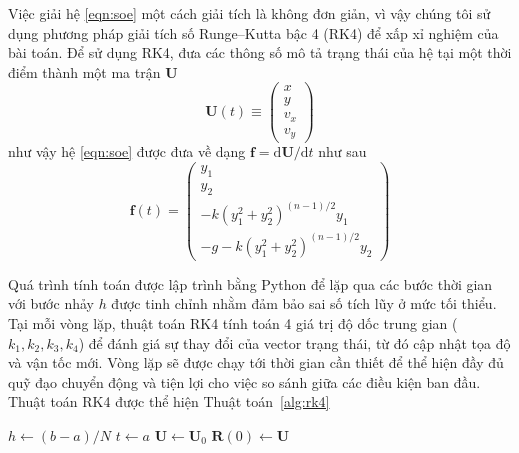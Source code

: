 Việc giải hệ \eqref{eqn:soe} một cách giải tích là không đơn giản, vì vậy chúng tôi sử dụng phương pháp giải tích số Runge--Kutta bậc 4 (RK4) để xấp xỉ nghiệm của bài toán. Để sử dụng RK4, đưa các thông số mô tả trạng thái của hệ tại một thời điểm thành một ma trận \(\mathbf{U}\)
\begin{equation}
  \mathbf{U}(t) \equiv \begin{pmatrix}
    x \\
    y \\
    v_x \\
    v_y
  \end{pmatrix}
\end{equation}
như vậy hệ \eqref{eqn:soe} được đưa về dạng \(\mathbf{f} = \mathrm{d}\mathbf{U}/\mathrm{d}t\) như sau
\begin{equation}
  \mathbf{f}(t) = \begin{pmatrix}
    y_1 \\
    y_2 \\
    -k(y_1^2 + y_2^2)^{(n - 1)/2} y_1 \\
    -g - k(y_1^2 + y_2^2)^{(n - 1)/2} y_2
  \end{pmatrix}
\end{equation}

Quá trình tính toán được lập trình bằng Python để lặp qua các bước thời gian với bước nhảy $h$ được tinh chỉnh nhằm đảm bảo sai số tích lũy ở mức tối thiểu. Tại mỗi vòng lặp, thuật toán RK4 tính toán 4 giá trị độ dốc trung gian ($k_1, k_2, k_3, k_4$) để đánh giá sự thay đổi của vector trạng thái, từ đó cập nhật tọa độ và vận tốc mới. Vòng lặp sẽ được chạy tới thời gian cần thiết để thể hiện đầy đủ quỹ đạo chuyển động và tiện lợi cho việc so sánh giữa các điều kiện ban đầu. Thuật toán RK4 được thể hiện Thuật toán~\ref{alg:rk4}

\begin{algorithm}
\SetAlgoLined
{}
\(h \leftarrow (b - a) / N\)\;
\(t \leftarrow a\)\;
\(\mathbf{U} \leftarrow \mathbf{U}_0\)\;
\(\mathbf{R}(0) \leftarrow \mathbf{U}\)\;
\;
\caption{Phương pháp Runge--Kutta bậc 4}\label{alg:rk4}
\end{algorithm}

